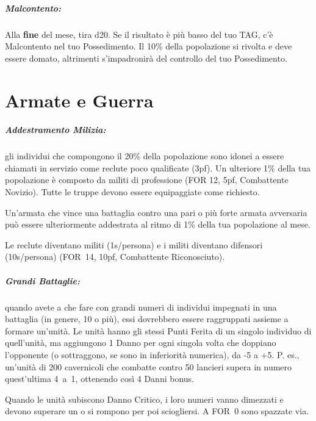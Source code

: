 \documentclass[itdr]{subfiles}
\begin{document}
\subparagraph{Malcontento:} Alla \textbf{fine} del mese, tira d20. Se il risultato è più basso del tuo TAG, c’è Malcontento nel tuo Possedimento. Il 10\% della popolazione si rivolta e deve essere domato, altrimenti s’impadronirà del controllo del tuo Possedimento. 

\vfill
\section{Armate e Guerra}


\subparagraph{Addestramento Milizia:} gli individui che compongono il 20\% della popolazione sono idonei a essere chiamati in servizio come reclute poco qualificate (3pf). Un ulteriore 1\% della tua popolazione è composto da militi di professione (FOR 12, 5pf, Combattente Novizio). Tutte le truppe devono essere equipaggiate come richiesto.

Un’armata che vince una battaglia contro una pari o più forte armata avversaria può essere ulteriormente addestrata al ritmo di 1\% della tua popolazione al mese. 

Le reclute diventano militi (1s/persona) e i \mbox{militi} diventano difensori (10s/persona) (FOR~14, 10pf, Combattente Riconosciuto).

\vfill
\break

\subparagraph{Grandi Battaglie:} quando avete a che fare con grandi numeri di individui impegnati in una battaglia (in genere, 10 o più), essi dovrebbero essere raggruppati assieme a formare un’unità. Le unità hanno gli stessi Punti Ferita di un singolo individuo di quell’unità, ma aggiungono 1 Danno per ogni singola volta che doppiano l’opponente (o sottraggono, se sono in inferiorità numerica), da -5 a +5. P. es., un’unità di 200 cavernicoli che combatte contro 50 lancieri supera in numero quest’ultima \mbox{4 a 1}, ottenendo così 4 Danni bonus.

Quando le unità subiscono Danno Critico, i loro numeri vanno dimezzati e devono superare un  o si rompono per poi sciogliersi. A FOR~0 sono spazzate via.
\end{document}
